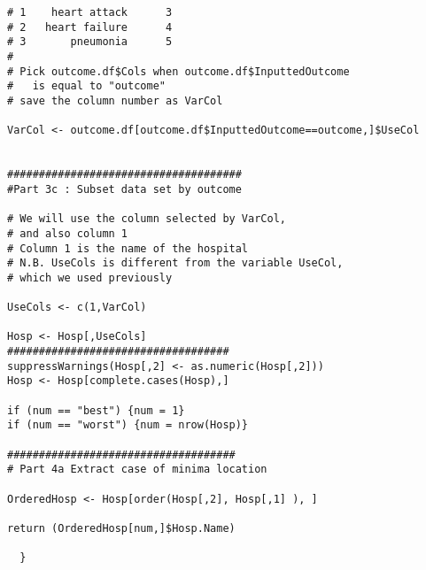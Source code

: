 \documentclass[]{article}
\begin{document}
\begin{framed}
\begin{verbatim}
# 1    heart attack      3
# 2   heart failure      4
# 3       pneumonia      5
#
# Pick outcome.df$Cols when outcome.df$InputtedOutcome 
#   is equal to "outcome"
# save the column number as VarCol

VarCol <- outcome.df[outcome.df$InputtedOutcome==outcome,]$UseCol


#####################################
#Part 3c : Subset data set by outcome

# We will use the column selected by VarCol, 
# and also column 1
# Column 1 is the name of the hospital
# N.B. UseCols is different from the variable UseCol, 
# which we used previously

UseCols <- c(1,VarCol)

Hosp <- Hosp[,UseCols]
###################################
suppressWarnings(Hosp[,2] <- as.numeric(Hosp[,2]))
Hosp <- Hosp[complete.cases(Hosp),]

if (num == "best") {num = 1}
if (num == "worst") {num = nrow(Hosp)}

####################################
# Part 4a Extract case of minima location 

OrderedHosp <- Hosp[order(Hosp[,2], Hosp[,1] ), ]

return (OrderedHosp[num,]$Hosp.Name)
                                     
  }  
\end{verbatim}
\end{framed}
\end{document}
